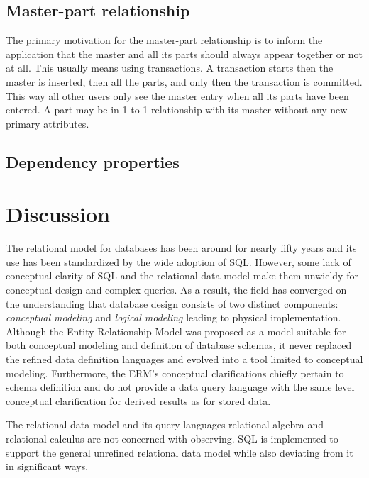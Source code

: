 \documentclass[letter,10pt]{article}
\begin{document}
\subsection{Master-part relationship}
The primary motivation for the master-part relationship is to inform the application that the master and all its parts should always appear together or not at all.  
This usually means using transactions.  
A transaction starts then the master is inserted, then all the parts, and only then the transaction is committed.  
This way all other users only see the master entry when all its parts have been entered.
A part may be in 1-to-1 relationship with its master without any new primary attributes.
\subsection{Dependency properties}

\section{Discussion}
The relational model for databases has been around for nearly fifty years and its use has been standardized by the wide adoption of SQL.
However, some lack of conceptual clarity of SQL and the relational data model make them unwieldy for conceptual design and complex queries.
As a result, the field has converged on the understanding that database design consists of two distinct components: \emph{conceptual modeling} and \emph{logical modeling} leading to physical implementation. 
Although the Entity Relationship Model was proposed as a model suitable for both conceptual modeling and definition of database schemas, it never replaced the refined data definition languages and evolved into a tool limited to conceptual modeling.  
Furthermore, the ERM's conceptual clarifications chiefly pertain to schema definition and do not provide a data query language with the same level conceptual clarification for derived results as for stored data.

The relational data model and its query languages relational algebra and relational calculus are not concerned with observing. 
SQL is implemented to support the general unrefined relational data model while also deviating from it in significant ways. 
\end{document}

